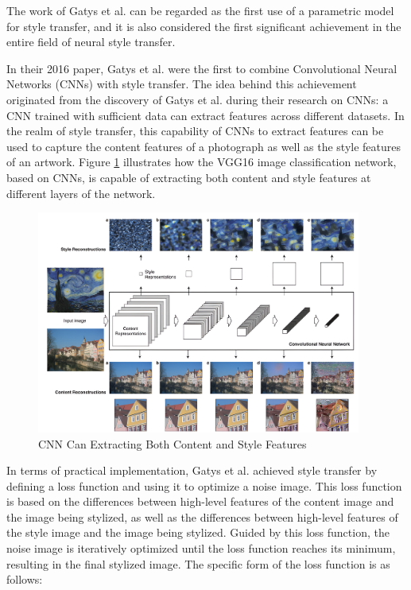 The work of Gatys et al. \citep{02gatys2016image} can be regarded as the first use of a parametric model for style transfer, and it is also considered the first significant achievement in the entire field of neural style transfer.

In their 2016 paper\citep{02gatys2016image}, Gatys et al. were the first to combine Convolutional Neural Networks (CNNs) with style transfer. The idea behind this achievement originated from the discovery of Gatys et al. during their research on CNNs: a CNN trained with sufficient data can extract features across different datasets\citep{02gatys2016image}. In the realm of style transfer, this capability of CNNs to extract features can be used to capture the content features of a photograph as well as the style features of an artwork. Figure \ref{fig3_VGGs_Ability} illustrates how the VGG16 image classification network, based on CNNs, is capable of extracting both content and style features at different layers of the network.

\begin{figure}[!htbp]%
    \centering%
    \includegraphics[width=0.95\textwidth]{fig/VGGs_Ability.png}
    \caption{CNN Can Extracting Both Content and Style Features}\label{fig3_VGGs_Ability}
\end{figure}

In terms of practical implementation, Gatys et al.\citep{02gatys2016image} achieved style transfer by defining a loss function and using it to optimize a noise image. This loss function is based on the differences between high-level features of the content image and the image being stylized, as well as the differences between high-level features of the style image and the image being stylized. Guided by this loss function, the noise image is iteratively optimized until the loss function reaches its minimum, resulting in the final stylized image. The specific form of the loss function is as follows:


